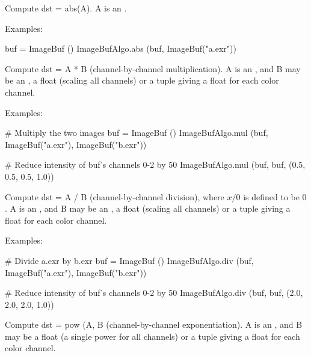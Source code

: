  
\NEW %

Compute {\cf dst = abs(A)}.  {\cf A} is an \ImageBuf.

\smallskip
\noindent Examples:
\begin{code}
    buf = ImageBuf ()
    ImageBufAlgo.abs (buf, ImageBuf("a.exr"))
\end{code}
\apiend


 

Compute {\cf dst} = {\cf A * B} (channel-by-channel multiplication).  {\cf A}
is an \ImageBuf, and {\cf B}  may be an \ImageBuf, a {\cf float} (scaling
all channels) or a tuple giving a {\cf float} for each color channel.

\smallskip
\noindent Examples:
\begin{code}
    # Multiply the two images
    buf = ImageBuf ()
    ImageBufAlgo.mul (buf, ImageBuf("a.exr"), ImageBuf("b.exr"))

    # Reduce intensity of buf's channels 0-2 by 50%
    ImageBufAlgo.mul (buf, buf, (0.5, 0.5, 0.5, 1.0))
\end{code}
\apiend


 
\NEW %

Compute {\cf dst} = {\cf A / B} (channel-by-channel division), where $x/0$
is defined to be $0$.  {\cf A} is an \ImageBuf, and {\cf B}  may be an
\ImageBuf, a {\cf float} (scaling all channels) or a tuple giving a {\cf
float} for each color channel.

\smallskip
\noindent Examples:
\begin{code}
    # Divide a.exr by b.exr
    buf = ImageBuf ()
    ImageBufAlgo.div (buf, ImageBuf("a.exr"), ImageBuf("b.exr"))

    # Reduce intensity of buf's channels 0-2 by 50%
    ImageBufAlgo.div (buf, buf, (2.0, 2.0, 2.0, 1.0))
\end{code}
\apiend


 

Compute {\cf dst} = {\cf pow (A, B} (channel-by-channel exponentiation).
{\cf A} is an \ImageBuf, and {\cf B} may be a {\cf float} (a single power
for all channels) or a tuple giving a {\cf float} for each color channel.

